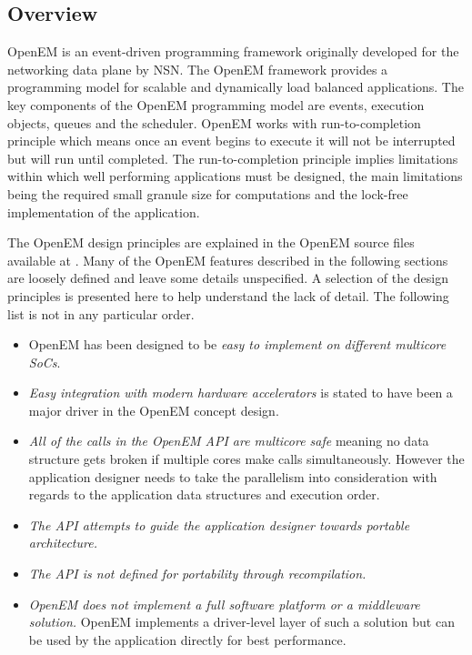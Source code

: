 \subsection{Overview}
OpenEM is an event-driven programming framework originally developed for the networking data plane by NSN. The OpenEM framework provides a programming model for scalable and dynamically load balanced applications. The key components of the OpenEM programming model are events, execution objects, queues and the scheduler. OpenEM works with run-to-completion principle which means once an event begins to execute it will not be interrupted but will run until completed. The run-to-completion principle implies limitations within which well performing applications must be designed, the main limitations being the required small granule size for computations and the lock-free implementation of the application. \cite{openempage}

The OpenEM design principles are explained in the OpenEM source files available at \cite{openempage}. Many of the OpenEM features described in the following sections are loosely defined and leave some details unspecified. A selection of the design principles is presented here to help understand the lack of detail.  The following list is not in any particular order.
\begin{itemize}
    \item OpenEM has been designed to be \emph{easy to implement on different multicore SoCs}.
    \item \emph{Easy integration with modern hardware accelerators} is stated to have been a major driver in the OpenEM concept design.
    \item \emph{All of the calls in the OpenEM API are multicore safe} meaning no data structure gets broken if multiple cores make calls simultaneously. However the application designer needs to take the parallelism into consideration with regards to the application data structures and execution order.
    \item \emph{The API attempts to guide the application designer towards portable architecture.}
    \item \emph{The API is not defined for portability through recompilation.}
    \item \emph{OpenEM does not implement a full software platform or a middleware solution.} OpenEM implements a driver-level layer of such a solution but can be used by the application directly for best performance.
\end{itemize}

